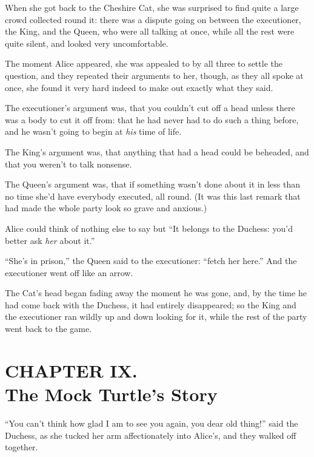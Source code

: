 \documentclass[11pt,openany,oneside]{book}
\begin{document}
When she got back to the Cheshire Cat, she was surprised to find quite a large crowd collected round it: there was a dispute going on between the executioner, the King, and the Queen, who were all talking at once, while all the rest were quite silent, and looked very uncomfortable. 

The moment Alice appeared, she was appealed to by all three to settle the question, and they repeated their arguments to her, though, as they all spoke at once, she found it very hard indeed to make out exactly what they said. 

The executioner’s argument was, that you couldn’t cut off a head unless there was a body to cut it off from: that he had never had to do such a thing before, and he wasn’t going to begin at {\em his\/} time of life. 

The King’s argument was, that anything that had a head could be beheaded, and that you weren’t to talk nonsense. 

The Queen’s argument was, that if something wasn’t done about it in less than no time she’d have everybody executed, all round. (It was this last remark that had made the whole party look so grave and anxious.) 

Alice could think of nothing else to say but “It belongs to the Duchess: you’d better ask {\em her\/} about it.” 

“She’s in prison,” the Queen said to the executioner: “fetch her here.” And the executioner went off like an arrow. 

The Cat’s head began fading away the moment he was gone, and, by the time he had come back with the Duchess, it had entirely disappeared; so the King and the executioner ran wildly up and down looking for it, while the rest of the party went back to the game. 


\clearpage{}
{}
\chapter*{CHAPTER IX.\\  The Mock Turtle’s Story}
\leavevmode\hypertarget{d12.fp137255}{}“You can’t think how glad I am to see you again, you dear old thing!” said the Duchess, as she tucked her arm affectionately into Alice’s, and they walked off together. 
\end{document}
